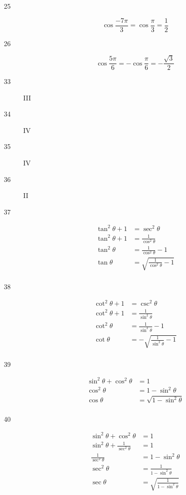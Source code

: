 \documentclass{exam}
\begin{document}
\begin{description}
      \item[25]
        \[
          \cos \frac{-7 \pi}{3} = \cos \frac{\pi}{3} = \boxed{ \frac{1}{2} }
        \]

      \item[26]
        \[
          \cos \frac{5 \pi}{6} = - \cos \frac{\pi}{6} = \boxed{ - \frac{\sqrt{3}}{2} }
        \]

      \item[33] III
      \item[34] IV
      \item[35] IV
      \item[36] II

      \item[37]
        \begin{align*}
          \tan^2 \theta + 1 & = \sec^2 \theta \\
          \tan^2 \theta + 1 & = \frac{1}{\cos^2 \theta} \\
          \tan^2 \theta     & = \frac{1}{\cos^2 \theta} - 1 \\
          \tan \theta       & = \boxed{ \sqrt{\frac{1}{\cos^2 \theta} - 1} } \\
        \end{align*}

      \item[38]
        \begin{align*}
          \cot^2 \theta + 1 & = \csc^2 \theta \\
          \cot^2 \theta + 1 & = \frac{1}{\sin^2 \theta} \\
          \cot^2 \theta     & = \frac{1}{\sin^2 \theta} - 1 \\
          \cot \theta       & = \boxed{ - \sqrt{ \frac{1}{\sin^2 \theta} - 1 } } \\
        \end{align*}

      \item[39]
        \begin{align*}
          \sin^2 \theta + \cos^2 \theta & = 1 \\
          \cos^2 \theta                 & = 1 - \sin^2 \theta \\
          \cos \theta                   & = \boxed{ \sqrt{ 1 - \sin^2 \theta } } \\
        \end{align*}

      \item[40]
        \begin{align*}
          \sin^2 \theta + \cos^2 \theta           & = 1 \\
          \sin^2 \theta + \frac{1}{\sec^2 \theta} & = 1 \\
          \frac{1}{\sec^2 \theta}                 & = 1 - \sin^2 \theta \\
          \sec^2 \theta                           & = \frac{1}{1 - \sin^2 \theta} \\
          \sec \theta                             & = \boxed{ \sqrt{ \frac{1}{1 - \sin^2 \theta} } } \\
        \end{align*}


\end{description}
\end{document}
